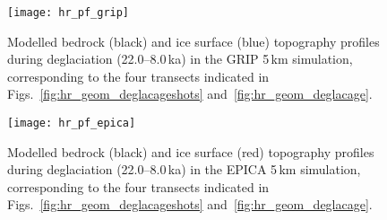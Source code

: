 \documentclass[tc, manuscript]{copernicus}
\begin{document}
\begin{figure}%
\texttt{[image: hr\_pf\_grip]}
\caption{%
Modelled bedrock (black) and ice surface (blue) topography profiles
           during deglaciation (22.0--8.0\,\unit{ka}) in the GRIP 5\,\unit{km}
           simulation, corresponding to the four transects indicated in
           Figs.~\ref{fig:hr_geom_deglacageshots} and~\ref{fig:hr_geom_deglacage}.}
\label{fig:hr_pf_grip}%
\end{figure}%


\begin{figure}%
\texttt{[image: hr\_pf\_epica]}
\caption{%
Modelled bedrock (black) and ice surface (red) topography profiles
           during deglaciation (22.0--8.0\,\unit{ka}) in the EPICA 5\,\unit{km}
           simulation, corresponding to the four transects indicated in
           Figs.~\ref{fig:hr_geom_deglacageshots} and~\ref{fig:hr_geom_deglacage}.}
\label{fig:hr_pf_epica}%
\end{figure}
\end{document}
